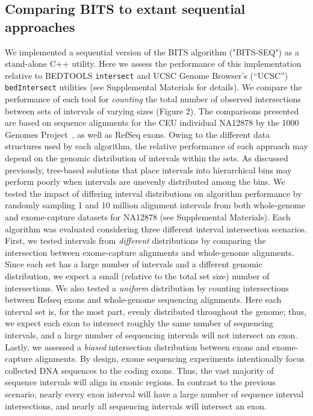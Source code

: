 \documentclass{bioinfo}
\begin{document}
\subsection{Comparing BITS to extant sequential approaches}
We implemented a sequential version of the BITS algorithm ("BITS-SEQ") as a 
stand-alone C++ utility. Here we assess the performance of this implementation 
relative to BEDTOOLS \texttt{intersect} and UCSC Genome Browser's (``UCSC'')
\citep{kent2002} \texttt{bedIntersect} utilities (see Supplemental Materials for
details).  We compare the performance of each tool for \emph{counting} the total
number of observed intersections between sets of intervals of varying sizes
(Figure 2). The comparisons presented are based on sequence alignments for the 
CEU individual NA12878 by the 1000 Genomes Project~\citep{durbin2010}, as well 
as RefSeq exons. Owing
to the different data structures used by each algorithm, the relative
performance of each approach may depend on the genomic distribution of intervals
within the sets. As discussed previously, tree-based solutions
that place intervals into hierarchical bins may perform poorly when intervals
are unevenly distributed among the bins. We tested the impact of differing
interval distributions on algorithm performance by randomly sampling 1 and 10
million alignment intervals from both whole-genome and exome-capture datasets
for NA12878 (see Supplemental Materials). Each algorithm was evaluated
considering three different interval intersection scenarios. First, we tested 
intervals from \emph{different} distributions by comparing the intersection 
between exome-capture alignments and whole-genome alignments. Since each set
has a large number of intervals and a different genomic 
distribution, we expect a small (relative to the total set size) number of 
intersections. We also tested a \emph{uniform} distribution by counting 
intersections between Refseq exons and whole-genome sequencing alignments.
Here each interval set is, for the most part, evenly distributed throughout
the genome; thus, we expect each exon to intersect roughly the same number
of sequencing intervals, and a large number of sequencing intervals will not
intersect an exon. Lastly, we assessed a \emph{biased} intersection
distribution between exons and exome-capture alignments. By design, 
exome sequencing experiments intentionally focus collected
DNA sequences to the coding exons. Thus, the vast majority of sequence intervals 
will align in exonic regions. In contrast to the previous scenario, nearly every 
exon interval will have a large number of sequence interval intersections, and 
nearly all sequencing intervals will intersect an exon.
\end{document}
